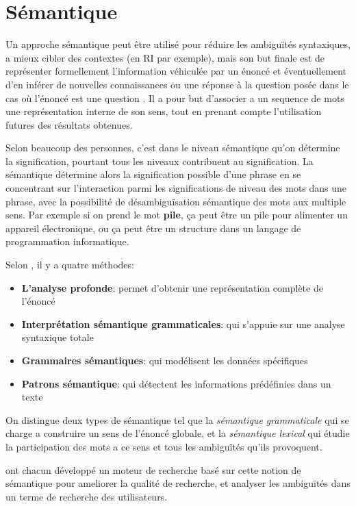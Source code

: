 \section{Sémantique}
Un approche sémantique peut être utilisé pour réduire les ambiguïtés syntaxiques, a mieux cibler des contextes (en RI par exemple), mais son but finale est de représenter formellement l’information véhiculée par un énoncé et éventuellement d’en inférer de nouvelles connaissances ou une réponse à la question posée dans le cas où l'énoncé est une question \citep{automatic-nlp}. Il a pour but d'associer a un sequence de mots une représentation interne de son sens, tout en prenant compte l'utilisation futures des résultats obtenues.

Selon beaucoup des personnes, c'est dans le niveau sémantique qu'on détermine la signification, pourtant tous les niveaux contribuent au signification. La sémantique détermine alors la signification possible d'une phrase en se concentrant sur l'interaction parmi les significations de niveau des mots dans une phrase, avec la possibilité de désambiguïsation sémantique des mots aux multiple sens. Par exemple si on prend le mot \textbf{pile}, ça peut être un pile pour alimenter un appareil électronique, ou ça peut être un structure dans un langage de programmation informatique.

Selon \citeauthor{automatic-nlp}, il y a quatre méthodes:
\begin{itemize}
    \item \textbf{L'analyse profonde}: permet d'obtenir une représentation complète de l’énoncé
    \item \textbf{Interprétation sémantique grammaticales}: qui s'appuie sur une analyse syntaxique totale
    \item \textbf{Grammaires sémantiques}: qui modélisent les données spécifiques
    \item \textbf{Patrons sémantique}: qui détectent les informations prédéfinies dans un texte
\end{itemize}

On distingue deux types de sémantique tel que la \textit{sémantique grammaticale} qui se charge a construire un sens de l'énoncé globale, et la \textit{sémantique lexical} qui étudie la participation des mots a ce sens et tous les ambiguïtés qu'ils provoquent.

\citeauthor{amelioration-ri-approche-semantique,approche-semantique} \citep{amelioration-ri-approche-semantique,approche-semantique} ont chacun développé un moteur de recherche basé sur cette notion de sémantique pour ameliorer la qualité de recherche, et analyser les ambiguïtés dans un terme de recherche des utilisateurs.


